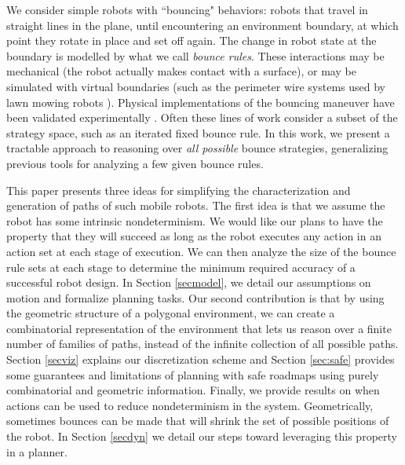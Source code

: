 \documentclass[sageh,times,Review]{sagej}
\begin{document}
We consider simple robots with ``bouncing" behaviors: robots that
travel in straight lines in the plane, until encountering an environment
boundary, at which point they rotate in place and set off again. The change in
robot state at the boundary is modelled by what we call {\em bounce rules}.
These interactions may be mechanical (the robot actually makes contact with a
surface), or may be simulated with
virtual boundaries (such as the perimeter wire systems used by lawn mowing robots
\cite{sahin2007household}). Physical implementations of the bouncing maneuver have
been validated experimentally \cite{alam2018space,LewOKa13}.
Often these lines of work consider a subset of the strategy space, such as an iterated fixed bounce rule. In this work, 
we present a tractable approach to reasoning over {\em all possible} bounce strategies,
generalizing previous tools for analyzing a few given bounce rules.

This paper presents three ideas for simplifying the characterization and
generation of paths of such mobile robots. The first idea is that we assume 
the robot has some intrinsic
nondeterminism. We would like our plans to have the property that they will
succeed as long as the
robot executes any action in an action set at each stage of execution.
We can then analyze the size of the bounce rule sets at each stage to
determine the minimum required accuracy of a successful robot design. In Section
\ref{secmodel}, we detail our assumptions on motion and formalize planning tasks.
Our second contribution is that by using the geometric
structure of a polygonal environment, we can create a combinatorial
representation of the environment that lets us reason over a finite number of
families of paths, instead of the infinite collection of all possible paths.
Section \ref{secviz} explains our discretization scheme and Section
\ref{sec:safe} provides some guarantees and limitations of planning with safe roadmaps 
using purely combinatorial and geometric information.
Finally, we provide results on when actions can be used to reduce
nondeterminism in the system. Geometrically, sometimes bounces can be made
that will shrink the set of possible positions of the robot.
In Section \ref{secdyn} we detail our steps toward leveraging this property in a planner.
\end{document}
